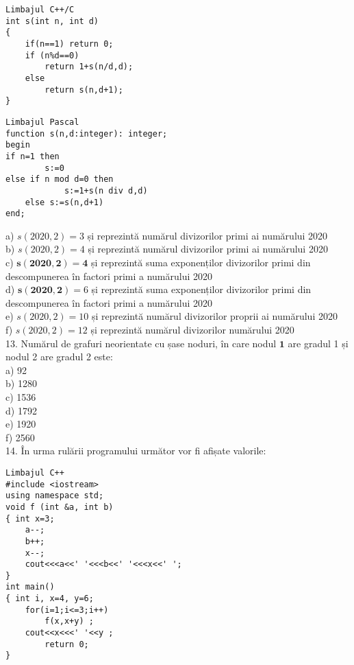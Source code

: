 \begin{verbatim}
Limbajul C++/C
int s(int n, int d)
{
    if(n==1) return 0;
    if (n%d==0)
        return 1+s(n/d,d);
    else
        return s(n,d+1);
}
\end{verbatim}

\begin{verbatim}
Limbajul Pascal
function s(n,d:integer): integer;
begin
if n=1 then
        s:=0
else if n mod d=0 then
            s:=1+s(n div d,d)
    else s:=s(n,d+1)
end;
\end{verbatim}

a) $s(2020,2)=3$ și reprezintă numărul divizorilor primi ai numărului 2020\\
b) $s(2020,2)=4$ și reprezintă numărul divizorilor primi ai numărului 2020\\
c) $\mathbf{s}(\mathbf{2 0 2 0}, \mathbf{2})=\mathbf{4}$ și reprezintă suma exponenților divizorilor primi din descompunerea în factori primi a numărului 2020\\
d) $\mathbf{s}(\mathbf{2 0 2 0}, \mathbf{2})=6$ și reprezintă suma exponenților divizorilor primi din descompunerea în factori primi a numărului 2020\\
e) $s(2020,2)=10$ și reprezintă numărul divizorilor proprii ai numărului 2020\\
f) $s(2020,2)=12$ și reprezintă numărul divizorilor numărului 2020\\
13. Numărul de grafuri neorientate cu șase noduri, în care nodul $\mathbf{1}$ are gradul 1 și nodul 2 are gradul 2 este:\\
a) 92\\
b) 1280\\
c) 1536\\
d) 1792\\
e) 1920\\
f) 2560\\
14. În urma rulării programului următor vor fi afișate valorile:

\begin{verbatim}
Limbajul C++
#include <iostream>
using namespace std;
void f (int &a, int b)
{ int x=3;
    a--;
    b++;
    x--;
    cout<<<a<<' '<<<b<<' '<<<x<<' ';
}
int main()
{ int i, x=4, y=6;
    for(i=1;i<=3;i++)
        f(x,x+y) ;
    cout<<x<<<' '<<y ;
        return 0;
}
\end{verbatim}


